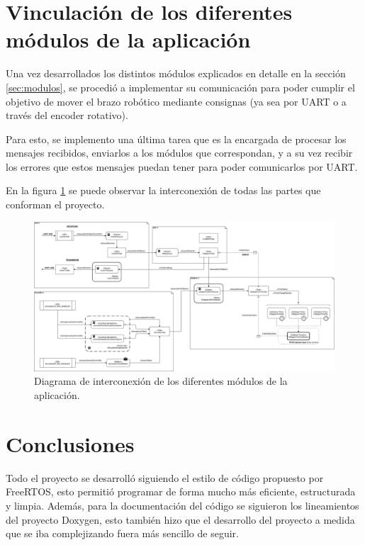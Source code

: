 \documentclass{IEEEtran}
\begin{document}
\section{Vinculación de los diferentes módulos de la aplicación}
\label{sec:vinculacion}

Una vez desarrollados los distintos módulos explicados en detalle en la sección \ref{sec:modulos}, se procedió a implementar su comunicación para poder cumplir el objetivo de mover el brazo robótico mediante consignas (ya sea por UART o a través del encoder rotativo).

Para esto, se implemento una última tarea que es la encargada de procesar los mensajes recibidos, enviarlos a los módulos que correspondan, y a su vez recibir los errores que estos mensajes puedan tener para poder comunicarlos por UART.

En la figura \ref{fig:diagrama-app} se puede observar la interconexión de todas las partes que conforman el proyecto.

\begin{figure}
    \centering
    \includegraphics[scale=0.35]{../diagrama_app.png}
    \caption{Diagrama de interconexión de los diferentes módulos de la aplicación.}
    \label{fig:diagrama-app}
\end{figure}

\section{Conclusiones}
\label{sec:conclusiones}
Todo el proyecto se desarrolló siguiendo el estilo de código propuesto por FreeRTOS, esto permitió programar de forma mucho más eficiente, estructurada y limpia. Además, para la documentación del código se siguieron los lineamientos del proyecto Doxygen, esto también hizo que el desarrollo del proyecto a medida que se iba complejizando fuera más sencillo de seguir.
\end{document}
